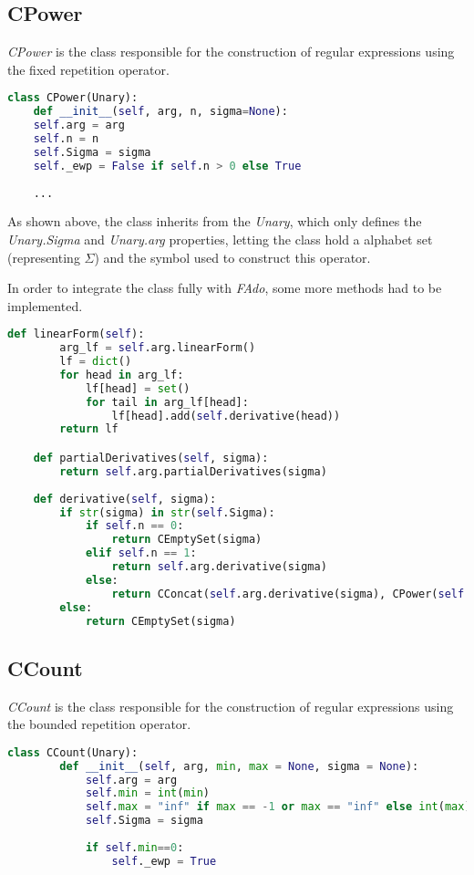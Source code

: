 \subsection{CPower}
\textit{CPower} is the class responsible for the construction of regular expressions using the fixed repetition operator.

\begin{lstlisting}[language=Python]
class CPower(Unary):
	def __init__(self, arg, n, sigma=None):
	self.arg = arg
	self.n = n
	self.Sigma = sigma
	self._ewp = False if self.n > 0 else True
	
	...
\end{lstlisting}

As shown above, the class inherits from the \textit{Unary}, which only defines the \textit{Unary.Sigma} and \textit{Unary.arg} properties, letting the class hold a alphabet set (representing $\Sigma$) and the symbol used to construct this operator.

In order to integrate the class fully with \textit{FAdo}, some more methods had to be implemented.

\begin{lstlisting}[language=Python]
	def linearForm(self):
		arg_lf = self.arg.linearForm()
		lf = dict()
		for head in arg_lf:
			lf[head] = set()
			for tail in arg_lf[head]:
				lf[head].add(self.derivative(head))
		return lf

	def partialDerivatives(self, sigma):
		return self.arg.partialDerivatives(sigma)
	
	def derivative(self, sigma):
		if str(sigma) in str(self.Sigma):
			if self.n == 0:
				return CEmptySet(sigma)
			elif self.n == 1:
				return self.arg.derivative(sigma)
			else:
				return CConcat(self.arg.derivative(sigma), CPower(self.arg, self.n-1, self.Sigma))
		else:
			return CEmptySet(sigma)
\end{lstlisting}

\subsection{CCount}
\textit{CCount} is the class responsible for the construction of regular expressions using the bounded repetition operator.


\begin{lstlisting}[language=Python]
	class CCount(Unary):
		def __init__(self, arg, min, max = None, sigma = None):
			self.arg = arg
			self.min = int(min)
			self.max = "inf" if max == -1 or max == "inf" else int(max)-1
			self.Sigma = sigma
	
			if self.min==0:
				self._ewp = True
\end{lstlisting}

